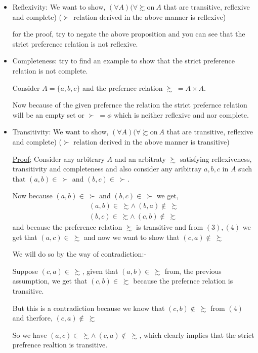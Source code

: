 \documentclass[12pt,a4paper]{article}
\begin{document}
    \begin{itemize}
      \item Reflexivity: We want to show,
      \(\left( \forall A  \right) (\forall \succsim  \text{on} \ A \)
      that are 
      transitive, reflexive and complete) (\(\succ \) relation derived in the above manner is reflexive) 
      
      for the proof, try to negate the above proposition and you can see that the strict preference relation is not reflexive.
      \item Completeness: try to find an example to show that the strict preference relation is not complete.
      
      Consider \(A = \{a,b,c\} \) and the prefernce relation \(\succsim \ = A \times A\).
      
      Now because of the given prefernce the relation the strict prefernce relation will be an empty set or \(\succ \ = \phi \) which is neither reflexive and nor complete.
      \pagebreak

      \item Transitivity: We want to show,
      \(\left( \forall A  \right) (\forall \succsim  \text{on} \ A \)
      that are 
      transitive, reflexive and complete) (\(\succ \) relation derived in the above manner is transitive)  
      \begin{tcolorbox} 
        \underline{Proof}; Consider any arbitrary \(A\) and an arbitraty \(\succsim \) satisfying reflexiveness, transitivity and completeness and also consider any aribitray \(a,b,c\) in \(A\) such that \((a,b) \in \ \succ \) and \((b,c) \in \ \succ \). 
        
        Now because \((a,b) \in \ \succ \) and \((b,c) \in \ \succ \) we get,
        \begin{align}
          \left( a,b \right) \in \ \succsim \wedge \ \left( b,a \right) \notin \ \succsim \\
          \left( b,c \right) \in \ \succsim \wedge \ \left( c,b \right) \notin \ \succsim 
        \end{align}
        and because the preference relation \(\succsim \) is transitive and from \((3),(4)\) we get that \(\left( a,c \right) \in \ \succsim \) and now we want to show that \((c,a) \notin \ \succsim \)  

        We will do so by the way of contradiction:-

        Suppose \(\left( c,a \right) \in \ \succsim \), given that \((a,b) \in \ \succsim \) from, the previous assumption, we get that \((c,b) \in \ \succsim \) because the prefernce relation is transitive.    
        
        But this is a contradiction because we know that \(\left( c,b \right) \notin \ \succsim \) from \((4)\) and therfore, \(\left( c,a \right) \notin \ \succsim \)
        
        So we have \(\left( a,c \right) \in \ \succsim \wedge \ \left( c,a \right) \notin \ \succsim \), which clearly implies that the strict prefrence realtion is transitive.  
      \end{tcolorbox} 
    \end{itemize}
\end{document}
